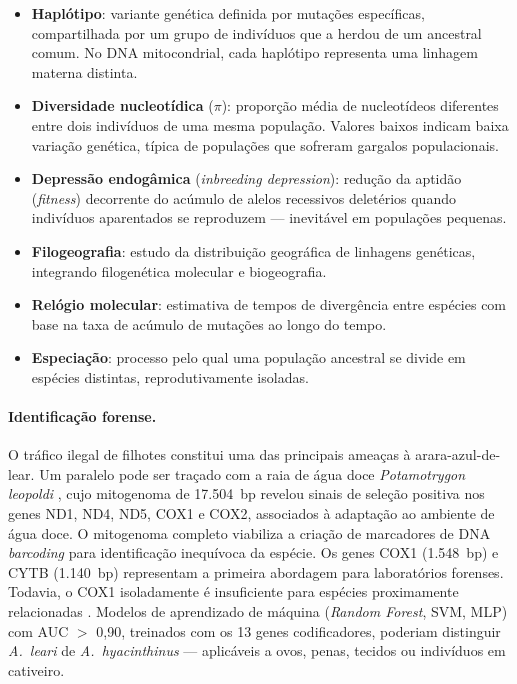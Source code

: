 \begin{itemize}
    \item \textbf{Haplótipo}: variante genética definida por mutações específicas, compartilhada por um grupo de indivíduos que a herdou de um ancestral comum. No DNA mitocondrial, cada haplótipo representa uma linhagem materna distinta.

    \item \textbf{Diversidade nucleotídica} ($\pi$): proporção média de nucleotídeos diferentes entre dois indivíduos de uma mesma população. Valores baixos indicam baixa variação genética, típica de populações que sofreram gargalos populacionais.

    \item \textbf{Depressão endogâmica} (\textit{inbreeding depression}): redução da aptidão (\textit{fitness}) decorrente do acúmulo de alelos recessivos deletérios quando indivíduos aparentados se reproduzem --- inevitável em populações pequenas.

    \item \textbf{Filogeografia}: estudo da distribuição geográfica de linhagens genéticas, integrando filogenética molecular e biogeografia.

    \item \textbf{Relógio molecular}: estimativa de tempos de divergência entre espécies com base na taxa de acúmulo de mutações ao longo do tempo.

    \item \textbf{Especiação}: processo pelo qual uma população ancestral se divide em espécies distintas, reprodutivamente isoladas.
\end{itemize}

\paragraph*{Identificação forense.}

O tráfico ilegal de filhotes constitui uma das principais ameaças à arara-azul-de-lear. Um paralelo pode ser traçado com a raia de água doce \textit{Potamotrygon leopoldi} \cite{guerreiro2025}, cujo mitogenoma de 17.504~bp revelou sinais de seleção positiva nos genes ND1, ND4, ND5, COX1 e COX2, associados à adaptação ao ambiente de água doce. O mitogenoma completo viabiliza a criação de marcadores de DNA \textit{barcoding} \cite{hebert2003} para identificação inequívoca da espécie. Os genes COX1 (1.548~bp) e CYTB (1.140~bp) representam a primeira abordagem para laboratórios forenses. Todavia, o COX1 isoladamente é insuficiente para espécies proximamente relacionadas \cite{ye2024}. Modelos de aprendizado de máquina (\textit{Random Forest}, SVM, MLP) com AUC $>$ 0,90, treinados com os 13 genes codificadores, poderiam distinguir \textit{A.~leari} de \textit{A.~hyacinthinus} --- aplicáveis a ovos, penas, tecidos ou indivíduos em cativeiro.


